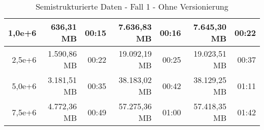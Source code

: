 \begin{table}
\begin{tabular}{|r|r|r|r|r|r|r|}
        1,0e+6          & 636,31 MB           & 00:15           & 7.636,83 MB         & 00:16           & 7.645,30 MB         & 00:22           \\ \hline
        2,5e+6          & 1.590,86 MB         & 00:22           & 19.092,19 MB        & 00:25           & 19.023,51 MB        & 00:37           \\ \hline
        5,0e+6          & 3.181,51 MB         & 00:35           & 38.183,02 MB        & 00:42           & 38.129,25 MB        & 01:11           \\ \hline
        7,5e+6          & 4.772,36 MB         & 00:49           & 57.275,36 MB        & 01:00           & 57.418,35 MB        & 01:42           \\ \hline
    \end{tabular}
    \caption{Semistrukturierte Daten - Fall 1 - Ohne Versionierung}
\end{table}

